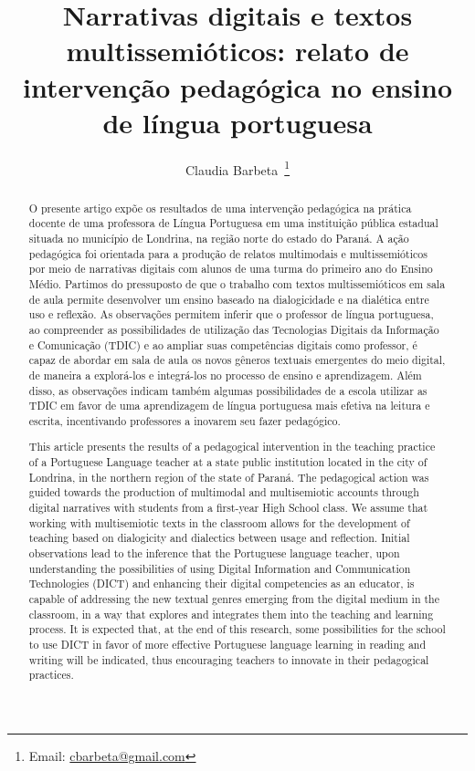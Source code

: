 \documentclass[portuguese]{textolivre}
\title{Narrativas digitais e textos multissemióticos: relato de intervenção pedagógica no ensino de língua portuguesa}
\author[1]{Claudia Barbeta~\orcid{0000-0002-2931-5933}\thanks{Email: \href{mailto:cbarbeta@gmail.com}{cbarbeta@gmail.com}}}
\affil[1]{Universidade Estadual de Londrina, Londrina, PR, Brasil.}
\begin{document}
\maketitle

\begin{polyabstract}
\begin{abstract}
O presente artigo expõe os resultados de uma intervenção pedagógica na prática docente de uma professora de Língua Portuguesa em uma instituição pública estadual situada no município de Londrina, na região norte do estado do Paraná. A ação pedagógica foi orientada para a produção de relatos multimodais e multissemióticos por meio de narrativas digitais com alunos de uma turma do primeiro ano do Ensino Médio. Partimos do pressuposto de que o trabalho com textos multissemióticos em sala de aula permite desenvolver um ensino baseado na dialogicidade e na dialética entre uso e reflexão. As observações permitem inferir que o professor de língua portuguesa, ao compreender as possibilidades de utilização das Tecnologias Digitais da Informação e Comunicação (TDIC) e ao ampliar suas competências digitais como professor, é capaz de abordar em sala de aula os novos gêneros textuais emergentes do meio digital, de maneira a explorá-los e integrá-los no processo de ensino e aprendizagem. Além disso, as observações indicam também algumas possibilidades de a escola utilizar as TDIC em favor de uma aprendizagem de língua portuguesa mais efetiva na leitura e escrita, incentivando professores a inovarem seu fazer pedagógico.

\end{abstract}

\begin{english}
\begin{abstract}
This article presents the results of a pedagogical intervention in the teaching practice of a Portuguese Language teacher at a state public institution located in the city of Londrina, in the northern region of the state of Paraná. The pedagogical action was guided towards the production of multimodal and multisemiotic accounts through digital narratives with students from a first-year High School class. We assume that working with multisemiotic texts in the classroom allows for the development of teaching based on dialogicity and dialectics between usage and reflection. Initial observations lead to the inference that the Portuguese language teacher, upon understanding the possibilities of using Digital Information and Communication Technologies (DICT) and enhancing their digital competencies as an educator, is capable of addressing the new textual genres emerging from the digital medium in the classroom, in a way that explores and integrates them into the teaching and learning process. It is expected that, at the end of this research, some possibilities for the school to use DICT in favor of more effective Portuguese language learning in reading and writing will be indicated, thus encouraging teachers to innovate in their pedagogical practices.



\end{abstract}
\end{english}
\end{polyabstract}
\end{document}
